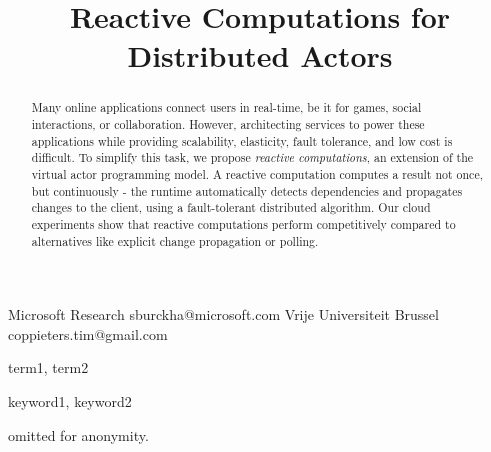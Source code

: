 \documentclass[preprint,numbers,10pt]{sigplanconf}
\begin{document}
\setlength{\pdfpageheight}{\paperheight}
\setlength{\pdfpagewidth}{\paperwidth}




\title{Reactive Computations for Distributed Actors}
\subtitle{}

           {Microsoft Research}
           {sburckha@microsoft.com}
           {Vrije Universiteit Brussel}
           {coppieters.tim@gmail.com}

\maketitle

\begin{abstract}
Many online applications connect users in real-time, be it for games, social interactions, or collaboration. However, architecting services to power these applications while providing scalability, elasticity, fault tolerance, and low cost is difficult. To simplify this task, we propose \emph{reactive computations}, an extension of the virtual actor programming model. A reactive computation computes a result not once, but continuously - the runtime automatically detects dependencies and propagates changes to the client, using a fault-tolerant distributed algorithm. Our cloud experiments show that reactive computations perform competitively compared to alternatives like explicit change propagation or polling. 
\end{abstract}


\terms
term1, term2

\keywords
keyword1, keyword2








 

 

\acks

omitted for anonymity.






\end{document}
